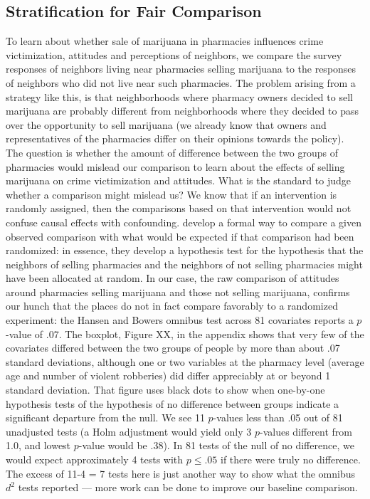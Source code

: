 \documentclass[11pt]{article}
\begin{document}
\subsection{Stratification for Fair Comparison}
To learn about whether sale of marijuana in pharmacies influences crime victimization, attitudes and perceptions of neighbors, we compare the survey responses of neighbors living near pharmacies selling marijuana to the responses of neighbors who did not live near such pharmacies. The problem arising from a strategy like this, is that neighborhoods where pharmacy owners decided to sell marijuana are probably different from neighborhoods where they decided to pass over the opportunity to sell marijuana (we already know that owners and representatives of the pharmacies differ on their opinions towards the policy). The question is whether the amount of difference between the two groups of pharmacies would mislead our comparison to learn about the effects of selling marijuana on crime victimization and attitudes. What is the standard to judge whether a comparison might mislead us? We know that if an intervention is randomly assigned, then the comparisons based on that intervention would not confuse causal effects with confounding. \citet{hansen2008cbs} develop a formal way to compare a given observed comparison with what would be expected if that comparison had been randomized: in essence, they develop a hypothesis test for the hypothesis that the neighbors of selling pharmacies and the neighbors of not selling pharmacies might have been allocated at random. In our case, the raw comparison of attitudes around pharmacies selling marijuana and those not selling marijuana, confirms our hunch that the places do not in fact compare favorably to a randomized experiment:  the Hansen and Bowers omnibus test across 81 covariates reports a $p$-value of .07. The boxplot, Figure XX, in the  appendix shows that very few of the covariates differed between the two groups of people by more than about .07 standard deviations, although one or two variables at the pharmacy level (average age and number of violent robberies) did differ appreciably at or beyond 1 standard deviation. That figure uses black dots to show when one-by-one hypothesis tests of the hypothesis of no difference between groups indicate a significant departure from the null. We see 11 $p$-values less than .05 out of 81 unadjusted tests (a Holm adjustment would yield only 3 $p$-values different from 1.0, and lowest $p$-value would be .38). In 81 tests of the null of no difference, we would expect approximately 4 tests with $p \le .05$ if there were truly no difference. The excess of 11-4 = 7 tests here is just another way to show what the omnibus $d^2$ tests reported --- more work can be done to improve our baseline comparison.
\end{document}
